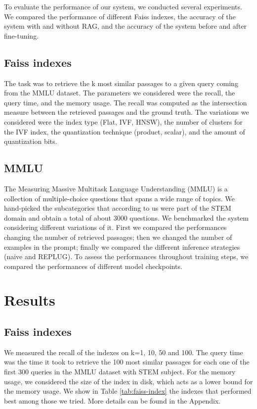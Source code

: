\documentclass[11pt]{article}
\begin{document}
To evaluate the performance of our system, we conducted several experiments.
We compared the performance of different Faiss indexes, the accuracy of the system with and without RAG,
and the accuracy of the system before and after fine-tuning.

\subsection{Faiss indexes}

The task was to retrieve the k most similar passages to a
given query coming from the MMLU dataset.
The parameters we considered were the recall, the query time, 
and the memory usage. 
The recall was computed as the intersection measure between the retrieved 
passages and the ground truth. 
The variations we considered were the index type (Flat, IVF, HNSW), the number 
of clusters for the IVF index, the quantization technique (product, scalar), and
the amount of quantization bits.

\subsection{MMLU}

The Measuring Massive Multitask Language Understanding (MMLU) is a collection of 
multiple-choice questions that spans a wide range of topics.
We hand-picked the subcategories that according to us were part of the STEM domain and
obtain a total of about 3000 questions.
We benchmarked the system considering different variations of it. First we compared the 
performances changing the number of retrieved passages; then we changed the number of 
examples in the prompt; finally we compared the different inference strategies (naive and REPLUG).
To assess the performances throughout training steps, we compared the performances of different 
model checkpoints.


\section{Results}

\subsection{Faiss indexes}

We measured the recall of the indexes on k=1, 10, 50 and 100. The query time was 
the time it took to retrieve the 100 most similar passages for each one of the first 300
queries in the MMLU dataset with STEM subject. 
For the memory usage, we considered the size of the index in disk, which acts as a lower
bound for the memory usage.
We show in Table \ref{tab:faiss-index} the indexes that performed best among those we tried. More details can be found in the Appendix.
\end{document}
